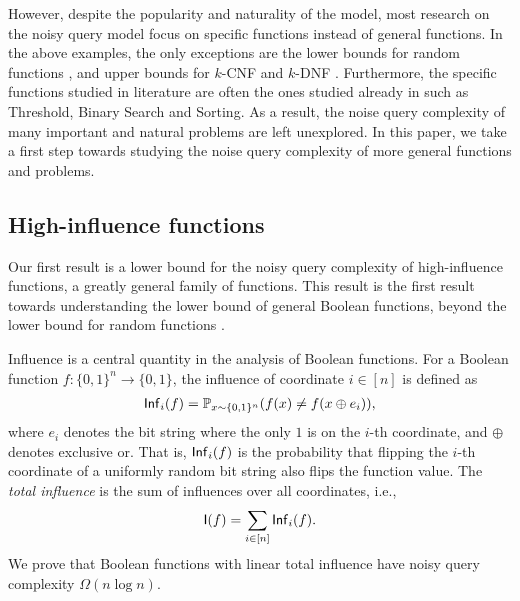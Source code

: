 However, despite the popularity and naturality of the model, most research on the noisy query model focus on specific functions instead of general functions. In the above examples, the only exceptions are the lower bounds for random functions \cite{reischuk1991reliable,feige1992complexity,evans1998average}, and upper bounds for $k$-CNF and $k$-DNF \cite{DBLP:journals/rsa/KenyonK94}. Furthermore, the specific functions studied in literature are often the ones studied already in \cite{feige1994computing} such as Threshold, Binary Search and Sorting. As a result, the noise query complexity of many important and natural problems are left unexplored. In this paper, we take a first step towards studying the noise query complexity of more general functions and problems.




\subsection{High-influence functions}

Our first result is a lower bound for the noisy query complexity of high-influence functions, a greatly general family of functions. This result is the first result towards understanding the lower bound of general Boolean functions, beyond the lower bound for random functions \cite{reischuk1991reliable,feige1992complexity,evans1998average}.

Influence is a central quantity in the analysis of Boolean functions. For a Boolean function $f: \{0,1\}^n\to \{0,1\}$, the influence of coordinate $i\in [n]$ is defined as
\begin{align*}
  \operatorname{\mathsf{Inf}}_i(f) =  \mathbb{P}_{x\sim \{0, 1\}^n}(f(x) \ne f(x\oplus e_i)),
\end{align*}
where $e_i$ denotes the bit string where the only $1$ is on the $i$-th coordinate, and $\oplus$ denotes exclusive or. That is, $\operatorname{\mathsf{Inf}}_i(f)$ is the probability that flipping the $i$-th coordinate of a uniformly random bit string also flips the function value.
The \emph{total influence} is the sum of influences over all coordinates, i.e.,
\begin{align*}
  \operatorname{\mathsf{I}}(f) = \sum_{i\in [n]} \operatorname{\mathsf{Inf}}_i(f).
\end{align*}
We prove that Boolean functions with linear total influence have noisy query complexity $\Omega(n\log n)$.

